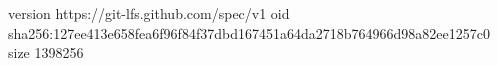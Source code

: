 version https://git-lfs.github.com/spec/v1
oid sha256:127ee413e658fea6f96f84f37dbd167451a64da2718b764966d98a82ee1257c0
size 1398256
